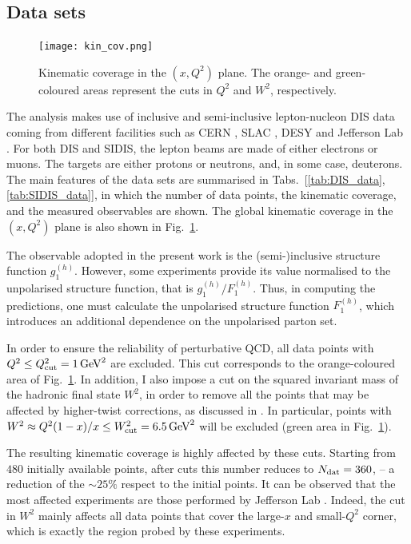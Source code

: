 \subsection*{Data sets}
\begin{figure}[t]
  \centering
  \texttt{[image: kin\_cov.png]} 
  \caption{\small{Kinematic coverage in the $(x,Q^2)$ plane. The orange- and green-coloured areas represent the cuts in $Q^2$ and $W^2$, respectively.}}
  \label{fig:kin_cov}
\end{figure}
The analysis makes use of inclusive and semi-inclusive lepton-nucleon DIS data coming from different facilities such as CERN \cite{EuropeanMuon:1989yki, SpinMuon:1999udj, COMPASS:2006mhr, COMPASS:2010wkz, COMPASS:2010hwr}, SLAC \cite{E142:1993hql, E143:1998hbs, E154:1997xfa, E155:2000qdr}, DESY \cite{HERMES:2018awh, HERMES:2006jyl, HERMES:1997hjr} and Jefferson Lab \cite{Kramer:2002tt, JeffersonLabHallA:2004tea, CLAS:2014qtg}. For both DIS and SIDIS, the lepton beams are made of either electrons or muons. The targets are either protons or neutrons, and, in some case, deuterons. The main features of the data sets are summarised in Tabs.~[\ref{tab:DIS_data}, \ref{tab:SIDIS_data}], in which the number of data points, the kinematic coverage, and the measured observables are shown. The global kinematic coverage in the $(x,Q^2)$ plane is also shown in Fig.~\ref{fig:kin_cov}. \par
The observable adopted in the present work is the (semi-)inclusive structure function $g_1^{(h)}$. However, some experiments provide its value normalised to the unpolarised structure function, that is $g_1^{(h)}/F_1^{(h)}$. Thus, in computing the predictions, one must calculate the unpolarised structure function $F_1^{(h)}$, which introduces an additional dependence on the unpolarised parton set.%

In order to ensure the reliability of perturbative QCD, all data points with $Q^2 \leq Q^2_{\textrm{cut}} = 1 \, \textrm{GeV}^2$ are excluded. This cut corresponds to the orange-coloured area of Fig.~\ref{fig:kin_cov}. In addition, I also impose a cut on the squared invariant mass of the hadronic final state $W^2$, in order to remove all the points that may be affected by higher-twist corrections, as discussed in . In particular, points with $W^2 \approx Q^2 (1-x)/x \leq W^2_{\textrm{cut}} = 6.5 \, \textrm{GeV}^2$ will be excluded (green area in Fig.~\ref{fig:kin_cov}).%

The resulting kinematic coverage is highly affected by these cuts. Starting from $480$ initially available points, after cuts this number reduces to $N_{\textrm{dat}}=360$,  -- a reduction of the $\sim 25\%$ respect to the initial points. It can be observed that the most affected experiments are those performed by Jefferson Lab \cite{Kramer:2002tt, JeffersonLabHallA:2004tea, CLAS:2014qtg}. Indeed, the cut in $W^2$ mainly affects all data points that cover the large-$x$ and small-$Q^2$ corner, which is exactly the region probed by these experiments.%

